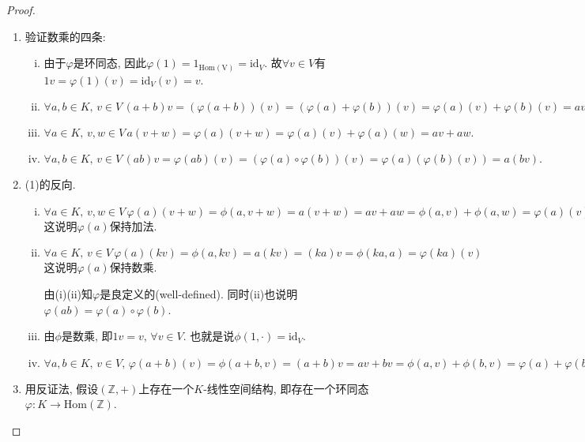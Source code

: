 \begin{proof}
    \begin{enumerate}[(1)]
        \item 验证数乘的四条:
        \begin{enumerate}[(i)]
            \item 由于$\varphi$是环同态, 因此$\varphi(1) = 1_{\mathrm{Hom(V)}} = \mathrm{id}_V$. 故$\forall v \in V$有$1v = \varphi(1)(v) = \mathrm{id}_V(v) = v$.
            \item 
            \(
                \forall a, b \in K,\, v \in V\, (a + b)v = (\varphi(a + b))(v) = (\varphi(a) + \varphi(b))(v) = \varphi(a)(v) + \varphi(b)(v) = av + bv.
            \)
            \item 
            \(
                \forall a \in K,\, v, w \in V\, a(v + w) = \varphi(a)(v + w) = \varphi(a)(v) + \varphi(a)(w) = av + aw.
            \)
            \item 
            \(
                \forall a, b \in K,\, v \in V\, (ab)v = \varphi(ab)(v) = (\varphi(a) \circ \varphi(b))(v) = \varphi(a)(\varphi(b)(v)) = a(bv).
            \)
        \end{enumerate}
        \item (1)的反向.
        \begin{enumerate}[(i)]
            \item 
            \(
                \forall a \in K,\, v, w \in V\, \varphi(a)(v + w) = \phi(a, v + w) = a(v + w) = av + aw = \phi(a, v) + \phi(a, w) = \varphi(a)(v) + \varphi(a)(w)
            \)
            这说明$\varphi(a)$保持加法.
            \item 
            \(
                \forall a \in K,\, v \in V\, \varphi(a)(kv) = \phi(a, kv) = a(kv) = (ka)v = \phi(ka, a) = \varphi(ka)(v)
            \)
            这说明$\varphi(a)$保持数乘.
            
            由(i)(ii)知$\varphi$是良定义的(well-defined). 同时(ii)也说明$\varphi(ab) = \varphi(a) \circ \varphi(b)$.
            \item 由$\phi$是数乘, 即$1v = v,\, \forall v \in V$. 也就是说$\phi(1, \cdot) = \mathrm{id}_V$.
            \item 
            \(
                \forall a, b \in K,\, v \in V,\, \varphi(a + b)(v) = \phi(a + b, v) = (a + b)v = av + bv = \phi(a, v) + \phi(b, v) = \varphi(a) + \varphi(b)
            \)
        \end{enumerate}
        \item 用反证法, 假设$(\mathbb{Z}, +)$上存在一个$K$-线性空间结构, 即存在一个环同态$\varphi: K \to \mathrm{Hom}(\mathbb{Z})$.
        

\end{enumerate}
\end{proof}
